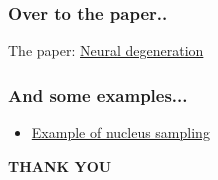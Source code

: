 \documentclass[11pt]{beamer}
\begin{document}
\begin{frame}
  \frametitle{Over to the paper..}
  The paper: \href{https://arxiv.org/abs/1904.09751}{Neural degeneration}
\end{frame}

\begin{frame}
  \frametitle{And some examples...}
  \begin{itemize}
    \item \href{https://github.com/minimaxir/gpt-2-simple/issues/51}{Example of nucleus sampling}
  \end{itemize}
\end{frame}


\begin{frame}
\begin{center}
{\bf THANK YOU}
\end{center}
\end{frame}
\end{document}
